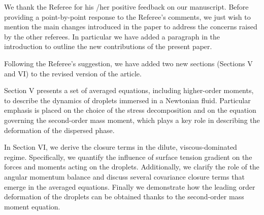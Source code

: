 \documentclass[10pt,a4paper]{article}
\newcommand{\tb}[1]{\color{blue}#1\color{black}}
\begin{document}
\tb{
    We thank the Referee for his /her positive feedback on our manuscript. 
    Before providing a point-by-point response to the Referee’s comments, we just wish to mention the main changes introduced in the paper to address the concerns raised by the other referees.
    In particular we have  added a paragraph in the introduction to outline the new contributions of the present paper.



Following the Referee’s suggestion, we have added two new sections (Sections V and VI) to the revised version of the article.

Section V presents a set of averaged equations, including higher-order moments, to describe the dynamics of droplets immersed in a Newtonian fluid. 
Particular emphasis is placed on the choice of the stress decomposition and on the equation governing the second-order mass moment, which plays a key role in describing the deformation of the dispersed phase.

In Section VI, we derive the closure terms in the dilute, viscous-dominated regime. 
Specifically, we quantify the influence of surface tension gradient on the forces and moments acting on the droplets. 
Additionally, we clarify the role of the angular momentum balance and discuss several covariance closure terms that emerge in the averaged equations.
Finally we demonstrate how the leading order deformation of the droplets can be obtained thanks to the second-order mass moment equation.


}
\end{document}
